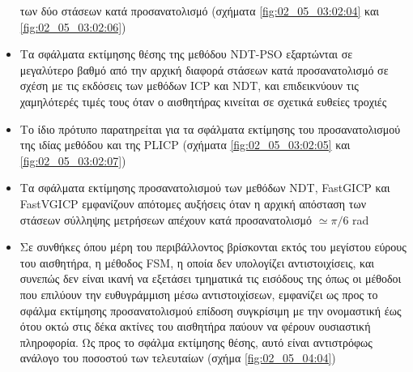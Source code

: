 \begin{itemize}
        των δύο στάσεων κατά προσανατολισμό (σχήματα \ref{fig:02_05_03:02:04}
        και \ref{fig:02_05_03:02:06})
  \item Τα σφάλματα εκτίμησης θέσης της μεθόδου NDT-PSO εξαρτώνται σε μεγαλύτερο
        βαθμό από την αρχική διαφορά στάσεων κατά προσανατολισμό σε σχέση με τις
        εκδόσεις των μεθόδων ICP και NDT, και επιδεικνύουν τις χαμηλότερές
        τιμές τους όταν ο αισθητήρας κινείται σε σχετικά ευθείες τροχιές
  \item Το ίδιο πρότυπο παρατηρείται για τα σφάλματα εκτίμησης του
        προσανατολισμού της ιδίας μεθόδου και της PLICP (σχήματα
        \ref{fig:02_05_03:02:05} και \ref{fig:02_05_03:02:07})
  \item Τα σφάλματα εκτίμησης προσανατολισμού των μεθόδων NDT, FastGICP και
        FastVGICP εμφανίζουν απότομες αυξήσεις όταν η αρχική απόσταση των
        στάσεων σύλληψης μετρήσεων απέχουν κατά προσανατολισμό $\simeq \pi/6$
        rad
  \item Σε συνθήκες όπου μέρη του περιβάλλοντος βρίσκονται εκτός του μεγίστου
        εύρους του αισθητήρα, η μέθοδος FSM, η οποία δεν υπολογίζει
        αντιστοιχίσεις, και συνεπώς δεν είναι ικανή να εξετάσει τμηματικά τις
        εισόδους της όπως οι μέθοδοι που επιλύουν την ευθυγράμμιση μέσω
        αντιστοιχίσεων, εμφανίζει ως προς το σφάλμα εκτίμησης
        προσανατολισμού επίδοση συγκρίσιμη με την ονομαστική έως ότου οκτώ
        στις δέκα ακτίνες του αισθητήρα παύουν να φέρουν ουσιαστική πληροφορία.
        Ως προς το σφάλμα εκτίμησης θέσης, αυτό είναι αντιστρόφως ανάλογο του
        ποσοστού των τελευταίων (σχήμα \ref{fig:02_05_04:04})
\end{itemize}
